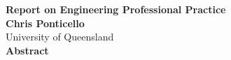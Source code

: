 \begin{center}
	{\Large \bf Report on Engineering Professional Practice} \\
	\vspace{0.4cm}
	{\Large \bf Chris Ponticello} \\
	\vspace{0.4cm}
	{\Large University of Queensland} \\
	\vspace{2.0cm}
	{\Large \bf Abstract} \\
\end{center}




